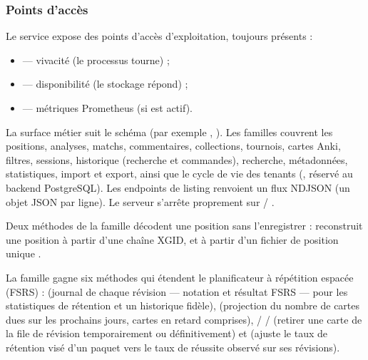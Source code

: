\documentclass[letterpaper,10pt,french]{sphinxmanual}
\begin{document}
\subsubsection{Points d’accès}
\label{\detokenize{mode_headless:points-d-acces}}
\sphinxAtStartPar
Le service expose des points d’accès d’exploitation, toujours présents :
\begin{itemize}
\item {} 
\sphinxAtStartPar
{} — vivacité (le processus tourne) ;

\item {} 
\sphinxAtStartPar
{} — disponibilité (le stockage répond) ;

\item {} 
\sphinxAtStartPar
{} — métriques Prometheus (si  est actif).

\end{itemize}

\sphinxAtStartPar
La surface métier suit le schéma  (par exemple
, ). Les familles couvrent les
positions, analyses, matchs, commentaires, collections, tournois, cartes Anki,
filtres, sessions, historique (recherche et commandes), recherche,
métadonnées, statistiques, import et export, ainsi que le cycle de vie des
tenants (, réservé au backend PostgreSQL). Les endpoints de
listing renvoient un flux NDJSON (un objet JSON par ligne). Le serveur
s’arrête proprement sur  / .

\sphinxAtStartPar
Deux méthodes de la famille  décodent une position sans
l’enregistrer :  reconstruit une position à partir d’une
chaîne XGID, et  à partir d’un fichier de position unique
.

\sphinxAtStartPar
La famille  gagne six méthodes qui étendent le planificateur à
répétition espacée (FSRS) :  (journal de chaque révision —
notation et résultat FSRS — pour les statistiques de rétention et un
historique fidèle),  (projection du nombre de cartes dues sur
les prochains jours, cartes en retard comprises),  /
 /  (retirer une carte de la file de
révision temporairement ou définitivement) et  (ajuste
le taux de rétention visé d’un paquet vers le taux de réussite observé sur ses
révisions).
\end{document}
